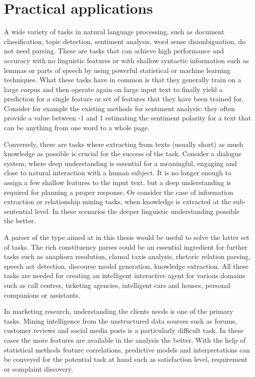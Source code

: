 \section{Practical applications}
    
    A wide variety of tasks in natural language processing, such as document classification, topic detection, sentiment analysis, word sense disambiguation, do not need parsing. These are tasks that can achieve high performance and accuracy with no linguistic features or with shallow syntactic information such as lemmas or parts of speech by using powerful statistical or machine learning techniques. What these tasks have in common is that they generally train on a large corpus and then operate again on large input text to finally yield a prediction for a single feature or set of features that they have been trained for. Consider for example the existing methods for sentiment analysis: they often provide a value between -1 and 1 estimating the sentiment polarity for a text that can be anything from one word to a whole page. 
 
    Conversely, there are tasks where extracting from texts (usually short) as much knowledge as possible is crucial for the success of the task. Consider a dialogue system, where deep understanding is essential for a meaningful, engaging and close to natural interaction with a human subject. It is no longer enough to assign a few shallow features to the input text, but a deep understanding is required for planning a proper response. Or consider the case of information extraction or relationship mining tasks, when knowledge is extracted at the sub-sentential level. In these scenarios the deeper linguistic understanding possible the better. 

    A parser of the type aimed at in this thesis would be useful to solve the latter set of tasks. The rich constituency parses could be an essential ingredient for further tasks such as anaphora resolution, clausal taxis analysis, rhetoric relation parsing, speech act detection, discourse model generation, knowledge extraction. All these tasks are needed for creating an intelligent interactive agent for various domains such as call centres, ticketing agencies, intelligent cars and houses, personal companions or assistants. 

    In marketing research, understanding the clients needs is one of the primary tasks. Mining intelligence from the unstructured data sources such as forums, customer reviews and social media posts is a particularly difficult task. In these cases the more features are available in the analysis the better. With the help of  statistical methods feature correlations, predictive models and interpretations can be conveyed for the potential task at hand such as satisfaction level, requirement or complaint discovery.
    
